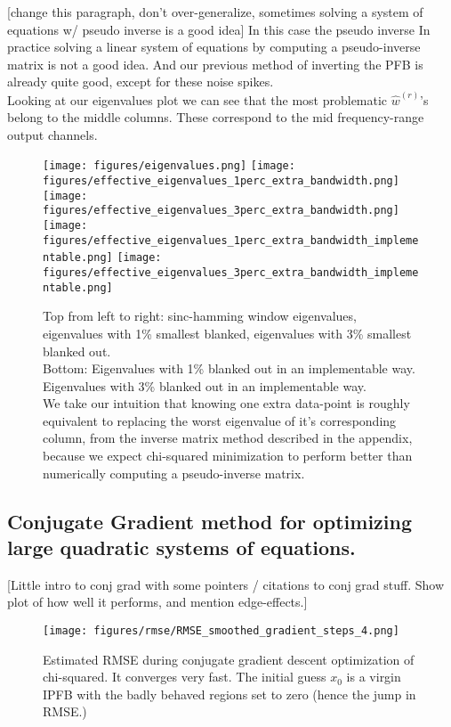 \documentclass[12pt]{article}
\begin{document}
[change this paragraph, don't over-generalize, sometimes solving a system of equations w/ pseudo inverse is a good idea] In this case the pseudo inverse In practice solving a linear system of equations by computing a pseudo-inverse matrix is not a good idea. And our previous method of inverting the PFB is already quite good, except for these noise spikes. \\

Looking at our eigenvalues plot we can see that the most problematic $\widehat w^{(r)}$'s belong to the middle columns. These correspond to the mid frequency-range output channels. 

\begin{figure}[H]
    \centering
    \texttt{[image: figures/eigenvalues.png]}
    \texttt{[image: figures/effective\_eigenvalues\_1perc\_extra\_bandwidth.png]}
    \texttt{[image: figures/effective\_eigenvalues\_3perc\_extra\_bandwidth.png]}
    \texttt{[image: figures/effective\_eigenvalues\_1perc\_extra\_bandwidth\_implementable.png]}
    \texttt{[image: figures/effective\_eigenvalues\_3perc\_extra\_bandwidth\_implementable.png]}
    \caption{Top from left to right: sinc-hamming window eigenvalues, eigenvalues with 1\% smallest blanked, eigenvalues with 3\% smallest blanked out.\\ 
    Bottom: Eigenvalues with 1\% blanked out in an implementable way. Eigenvalues with 3\% blanked out in an implementable way.\\ 
    We take our intuition that knowing one extra data-point is roughly equivalent to replacing the worst eigenvalue of it's corresponding column, from the inverse matrix method described in the appendix, because we expect chi-squared minimization to perform better than numerically computing a pseudo-inverse matrix.}
    \label{fig:eigenvalues}
\end{figure}




\subsection{Conjugate Gradient method for optimizing large quadratic systems of equations.}

[Little intro to conj grad with some pointers / citations to conj grad stuff. Show plot of how well it performs, and mention edge-effects.]

\begin{figure}[H]
    \centering
    \texttt{[image: figures/rmse/RMSE\_smoothed\_gradient\_steps\_4.png]}
    \caption{Estimated RMSE during conjugate gradient descent optimization of chi-squared. It converges very fast. The initial guess $x_0$ is a virgin IPFB with the badly behaved regions set to zero (hence the jump in RMSE.)}
    \label{fig:RMSE conj crad descent}
\end{figure}
\end{document}
